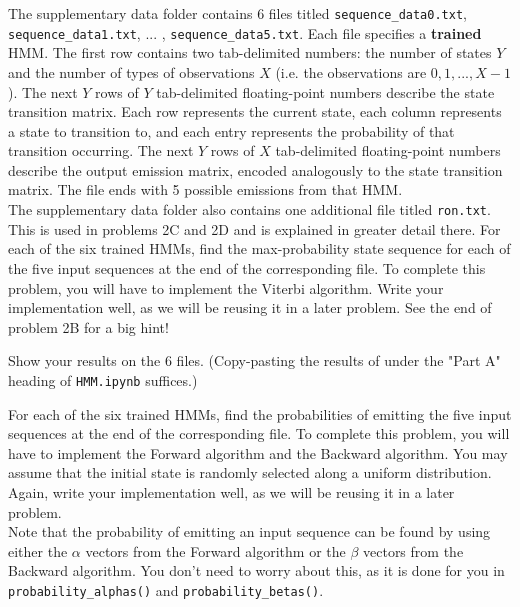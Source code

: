 The supplementary data folder contains 6 files titled \texttt{sequence_data0.txt}, \texttt{sequence_data1.txt}, ... , \texttt{sequence_data5.txt}. Each file specifies a \textbf{trained} HMM. The first row contains two tab-delimited numbers: the number of states $Y$ and the number of types of observations $X$ (i.e. the observations are $0, 1, . . . , X - 1$). The next $Y$ rows of $Y$ tab-delimited floating-point numbers describe the state transition matrix. Each row represents the current state, each column represents a state to transition to, and each entry represents the probability of that transition occurring. The next $Y$ rows of $X$ tab-delimited floating-point numbers describe the output emission matrix, encoded analogously to the state transition matrix. The file ends with 5 possible emissions from that HMM. \\

The supplementary data folder also contains one additional file titled \texttt{ron.txt}. This is used in problems 2C and 2D and is explained in greater detail there. 
\indent\problem[10] %
For each of the six trained HMMs, find the max-probability state sequence for each of the five input sequences at the end of the corresponding file. To complete this problem, you will have to implement the Viterbi algorithm. Write your implementation well, as we will be reusing it in a later problem. See the end of problem 2B for a big hint!

Show your results on the 6 files. (Copy-pasting the results of under the "Part A" heading of \texttt{HMM.ipynb} suffices.)
\begin{solution}
\end{solution}
\indent\problem[17] %
For each of the six trained HMMs, find the probabilities of emitting the five input sequences at the end of the corresponding file. To complete this problem, you will have to implement the Forward algorithm and the Backward algorithm. You may assume that the initial state is randomly selected along a uniform distribution. Again, write your implementation well, as we will be reusing it in a later problem. \\

Note that the probability of emitting an input sequence can be found by using either the $\alpha$ vectors from the Forward algorithm or the $\beta$ vectors from the Backward algorithm. You don't need to worry about this, as it is done for you in \texttt{probability\_alphas()} and \texttt{probability\_betas()}.

